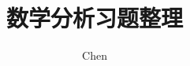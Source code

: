 
\newcommand{\booknotetitle}[2][plain]{%
    \clearpage
    \phantomsection
    \addcontentsline{toc}{chapter}{#2}
    \markboth{#2}{}
    \thispagestyle{#1}
    \vspace*{1.2cm}
    \begin{center}
        {\sffamily\heiti\bfseries\fontsize{26}{34}\selectfont\color{bookblue}#2\par}
        \vspace{0.8em}
        {\color{bookteal}\rule{4.5cm}{0.8pt}\par}
    \end{center}
    \vspace{0.6cm}
}

\renewcommand{\proofname}{证明}
\renewcommand{\qedsymbol}{\color{bookteal}\ensuremath{\blacksquare}}

\title{数学分析习题整理}
\author{Chen}
\date{}

